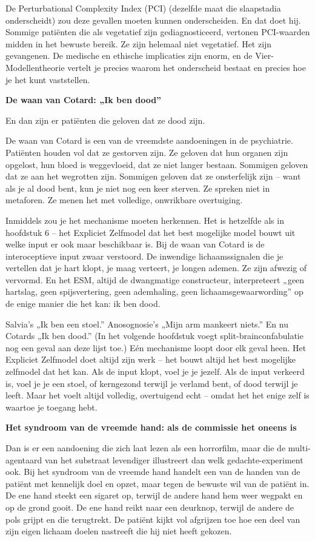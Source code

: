 \documentclass[11pt, twoside, openright]{book}
\begin{document}
De Perturbational Complexity Index (PCI) (dezelfde maat die slaapstadia onderscheidt) zou deze gevallen moeten kunnen onderscheiden. En dat doet hij. Sommige patiënten die als vegetatief zijn gediagnosticeerd, vertonen PCI-waarden midden in het bewuste bereik. Ze zijn helemaal niet vegetatief. Het zijn gevangenen. De medische en ethische implicaties zijn enorm, en de Vier-Modellentheorie vertelt je precies waarom het onderscheid bestaat en precies hoe je het kunt vaststellen.

\textbf{De waan van Cotard: „Ik ben dood”}

En dan zijn er patiënten die geloven dat ze dood zijn.

De waan van Cotard is een van de vreemdste aandoeningen in de psychiatrie. Patiënten houden vol dat ze gestorven zijn. Ze geloven dat hun organen zijn opgelost, hun bloed is weggevloeid, dat ze niet langer bestaan. Sommigen geloven dat ze aan het wegrotten zijn. Sommigen geloven dat ze onsterfelijk zijn -- want als je al dood bent, kun je niet nog een keer sterven. Ze spreken niet in metaforen. Ze menen het met volledige, onwrikbare overtuiging.

Inmiddels zou je het mechanisme moeten herkennen. Het is hetzelfde als in hoofdstuk 6 -- het Expliciet Zelfmodel dat het best mogelijke model bouwt uit welke input er ook maar beschikbaar is. Bij de waan van Cotard is de interoceptieve input zwaar verstoord. De inwendige lichaamssignalen die je vertellen dat je hart klopt, je maag verteert, je longen ademen. Ze zijn afwezig of vervormd. En het ESM, altijd de dwangmatige constructeur, interpreteert „geen hartslag, geen spijsvertering, geen ademhaling, geen lichaamsgewaarwording” op de enige manier die het kan: ik ben dood.

Salvia's „Ik ben een stoel.” Anosognosie's „Mijn arm mankeert niets.” En nu Cotards „Ik ben dood.” (In het volgende hoofdstuk voegt split-brainconfabulatie nog een geval aan deze lijst toe.) Eén mechanisme loopt door elk geval heen. Het Expliciet Zelfmodel doet altijd zijn werk -- het bouwt altijd het best mogelijke zelfmodel dat het kan. Als de input klopt, voel je je jezelf. Als de input verkeerd is, voel je je een stoel, of kerngezond terwijl je verlamd bent, of dood terwijl je leeft. Maar het voelt altijd volledig, overtuigend echt -- omdat het het enige zelf is waartoe je toegang hebt.

\textbf{Het syndroom van de vreemde hand: als de commissie het oneens is}

Dan is er een aandoening die zich laat lezen als een horrorfilm, maar die de multi-agentaard van het substraat levendiger illustreert dan welk gedachte-experiment ook. Bij het syndroom van de vreemde hand handelt een van de handen van de patiënt met kennelijk doel en opzet, maar tegen de bewuste wil van de patiënt in. De ene hand steekt een sigaret op, terwijl de andere hand hem weer wegpakt en op de grond gooit. De ene hand reikt naar een deurknop, terwijl de andere de pols grijpt en die terugtrekt. De patiënt kijkt vol afgrijzen toe hoe een deel van zijn eigen lichaam doelen nastreeft die hij niet heeft gekozen.
\end{document}
